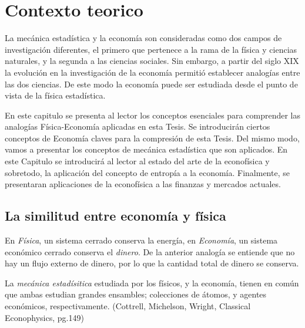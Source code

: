 %
\chapter{Contexto teorico}
\label{contexto}



La mecánica estadística y la economía son consideradas como dos campos de investigación diferentes, el primero que pertenece a la rama de la física y ciencias naturales, y la segunda a las ciencias sociales.
Sin embargo, a partir del siglo XIX la evolución en la investigación de la economía permitió establecer analogías entre las dos ciencias.
De este modo la economía puede ser estudiada desde el punto de vista de la física estadística.

En este capitulo se presenta al lector los conceptos esenciales para comprender las analogías Física-Economía aplicadas en esta Tesis.
Se introducirán ciertos conceptos de Economía claves para la compresión de esta Tesis.
Del mismo modo, vamos a presentar los conceptos de mecánica estadística que son aplicados. 
En este Capitulo se introducirá al lector al estado del arte de la econofísica y sobretodo, la aplicación del concepto de entropía a la economía.
Finalmente, se presentaran aplicaciones de la econofísica a las finanzas y mercados actuales.

\section{La similitud entre economía y física}


En \textit{Física}, un sistema cerrado conserva la energía,  en \textit{Economía}, un sistema económico cerrado conserva el \textit{dinero}. 
De la anterior analogía se entiende que no hay un flujo externo de dinero, por lo que la cantidad total de dinero se conserva.

La \textit{mecánica estadísitica} estudiada por los físicos, y la economía, tienen en común que ambas estudian grandes ensambles; colecciones de átomos, y agentes económicos, respectivamente.
(Cottrell, Michelson, Wright, Classical Econophysics, pg.149)

